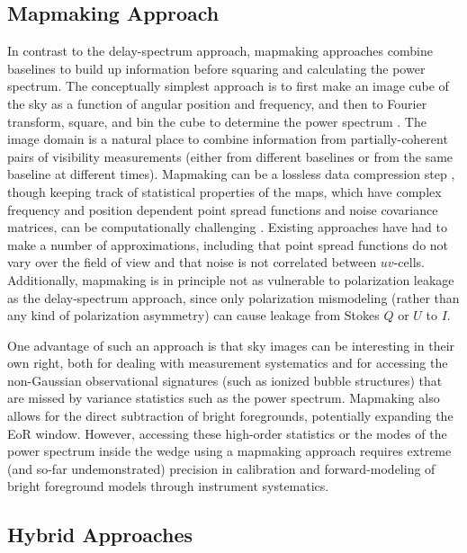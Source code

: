 \documentclass[preprint,11pt]{aastex}
\begin{document}
\subsection{Mapmaking Approach}
\label{sec:mapapproach}
In contrast to the delay-spectrum approach, mapmaking approaches combine baselines to build up information before squaring and calculating the power spectrum.  The conceptually simplest approach is to first make an image cube of the sky as a function of angular position and frequency, and then to Fourier transform, square, and bin the cube to determine the power spectrum \citep{liu_tegmark2011,dillon_et_al2013a}. The image domain is a natural place to combine information from partially-coherent pairs of visibility measurements (either from different baselines or from the same baseline at different times). Mapmaking can be a lossless data compression step \citep{tegmark1997b}, though keeping track of statistical properties of the maps, which have complex frequency and position dependent point spread functions and noise covariance matrices, can be computationally challenging \citep{dillon_et_al2015a}. Existing approaches have had to make a number of approximations, including that point spread functions do not vary over the field of view and that noise is not correlated between $uv$-cells. Additionally, mapmaking is in principle not as vulnerable to polarization leakage as the delay-spectrum approach, since only polarization mismodeling (rather than any kind of polarization asymmetry) can cause leakage from Stokes $Q$ or $U$ to $I$.


One advantage of such an approach is that sky images can be interesting in their own right, both for dealing with measurement systematics and for accessing the non-Gaussian observational signatures (such as ionized bubble structures) that are missed by variance statistics such as the power spectrum. Mapmaking also allows for the direct subtraction of bright foregrounds, potentially expanding the EoR window. However, accessing these high-order statistics or the modes of the power spectrum inside the wedge using a mapmaking approach requires extreme (and so-far undemonstrated) precision in calibration and forward-modeling of bright foreground models through instrument systematics. 



\subsection{Hybrid Approaches}
\label{sec:hybridapproach}
\end{document}

